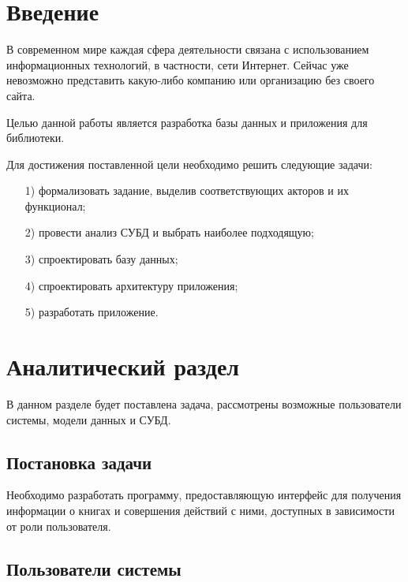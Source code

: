 
\usepackage{enumitem}
\usepackage{kosrem}
\usepackage{gensymb}







\setcounter{page}{3}

\clearpage
\tableofcontents

\clearpage
\section*{Введение}
В современном мире каждая сфера деятельности связана с использованием информационных технологий, в частности, сети Интернет. Сейчас уже невозможно представить какую-либо компанию или организацию без своего сайта.

Целью данной работы является разработка базы данных и приложения для библиотеки. 

Для достижения поставленной цели необходимо решить следующие задачи:
\begin{itemize}
	\item[1)] формализовать задание, выделив соответствующих акторов и их функционал;
	\item[2)] провести анализ СУБД и выбрать наиболее подходящую;
	\item[3)] спроектировать базу данных;
	\item[4)] спроектировать архитектуру приложения;
	\item[5)] разработать приложение.
\end{itemize}

\clearpage
\section{Аналитический раздел}
В данном разделе будет поставлена задача, рассмотрены возможные пользователи системы, модели данных и СУБД.

\subsection{Постановка задачи}
Необходимо разработать программу, предоставляющую интерфейс для получения информации о книгах и совершения действий с ними, доступных в зависимости от роли пользователя.
\subsection{Пользователи системы}
